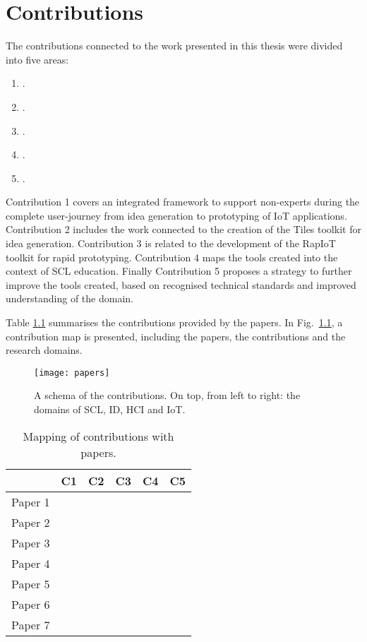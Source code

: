 \chapter{Contributions}
\label{cha:contributions}

The contributions connected to the work presented in this thesis were divided into five areas:

\begin{enumerate}
	\def\labelenumi{\arabic{enumi}.} 
	\itemsep1pt\parskip0pt 
	\item \Ci.
	\item \Cii.
	\item \Ciii. 
	\item \Civ.
	\item \Cv.
\end{enumerate}

Contribution 1 covers an integrated framework to support non-experts during the complete user-journey from idea generation to prototyping of IoT applications. Contribution 2 includes the work connected to the creation of the Tiles toolkit for idea generation. Contribution 3 is related to the development of the RapIoT toolkit for rapid prototyping. Contribution 4 maps the tools created into the context of SCL education. Finally Contribution 5 proposes a strategy to further improve the tools created, based on recognised technical standards and improved understanding of the domain.

Table \ref{tab:papers-and-contributions} summarises the contributions provided by the papers. In Fig.~\ref{fig:papers-contributions}, a contribution map is presented, including the papers, the contributions and the research domains.

\begin{figure}[ptb]
    \centering 
	\texttt{[image: papers]}
	\caption{A schema of the contributions. On top, from left to right: the domains of SCL, ID, HCI and IoT.}
	\label{fig:papers-contributions}
\end{figure}

\begin{table}[tbh]
	\centering 
	\caption{Mapping of contributions with papers.} 
	\label{tab:papers-and-contributions} 
	\smallskip
	\begin{tabular}{@{}lccccc@{}}
	\toprule
	  & C1 & C2 & C3 & C4 & C5 \\
	\midrule
	Paper 1 & & & & \textbullet & \\
	Paper 2 & & \textbullet & & \textbullet & \\
	Paper 3 & \textbullet & \textbullet & & \textbullet & \\
	Paper 4 & & \textbullet & & & \\
	Paper 5 & & & & \textbullet & \\
	Paper 6 & & & \textbullet & & \textbullet \\
	Paper 7 & \textbullet & & \textbullet & \textbullet & \textbullet \\
	\bottomrule 
	\end{tabular}
\end{table}


